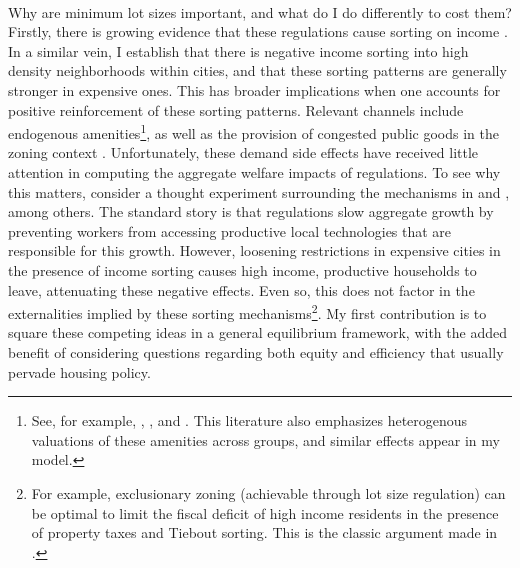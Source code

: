 \documentclass[]{article}
\begin{document}
\paragraph*{}
Why are minimum lot sizes important, and what do I do differently to cost them? Firstly, there is growing evidence that these regulations cause sorting on income \citep{kulka} \citep{Song}. In a similar vein, I establish that there is negative income sorting into high density neighborhoods within cities, and that these sorting patterns are generally stronger in expensive ones. This has broader implications when one accounts for positive reinforcement of these sorting patterns. Relevant channels include endogenous amenities\footnote{See, for example, \cite{Coutureetal}, \cite{AlmagroDI}, \cite{diamond2016} and \cite{bshartley2020}. This literature also emphasizes heterogenous valuations of these amenities across groups, and similar effects appear in my model.}, as well as the provision of congested public goods in the zoning context \citep{calabresetal} \citep{ineffTiebout}. Unfortunately, these demand side effects have received little attention in computing the aggregate welfare impacts of regulations. To see why this matters, consider a thought experiment surrounding the mechanisms in \cite{hseihmoretti} and \cite{durantonpugaurbgrowth}, among others. The standard story is that regulations slow aggregate growth by preventing workers from accessing productive local technologies that are responsible for this growth. However, loosening restrictions in expensive cities in the presence of income sorting causes high income, productive households to leave, attenuating these negative effects. Even so, this does not factor in the externalities implied by these sorting mechanisms\footnote{For example, exclusionary zoning (achievable through lot size regulation) can be optimal to limit the fiscal deficit of high income residents in the presence of property taxes and Tiebout sorting. This is the classic argument made in \cite{hamilton1976}.}. My first contribution is to square these competing ideas in a general equilibrium framework, with the added benefit of considering questions regarding both equity and efficiency that usually pervade housing policy.     
\end{document}
